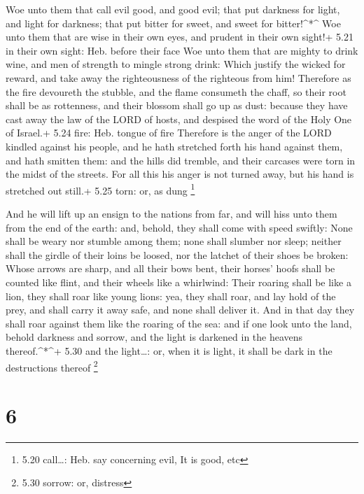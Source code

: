  Woe unto them that call evil good, and good evil; that put
darkness for light, and light for darkness; that put bitter for sweet,
and sweet for bitter!\^{}*\^{}  Woe unto them that are wise
in their own eyes, and prudent in their own sight!+ 5.21 in their own
sight: Heb. before their face  Woe unto them that are
mighty to drink wine, and men of strength to mingle strong drink:
 Which justify the wicked for reward, and take away the
righteousness of the righteous from him!  Therefore as the
fire devoureth the stubble, and the flame consumeth the chaff, so their
root shall be as rottenness, and their blossom shall go up as dust:
because they have cast away the law of the LORD of hosts, and despised
the word of the Holy One of Israel.+ 5.24 fire: Heb. tongue of fire
 Therefore is the anger of the LORD kindled against his
people, and he hath stretched forth his hand against them, and hath
smitten them: and the hills did tremble, and their carcases were torn in
the midst of the streets. For all this his anger is not turned away, but
his hand is stretched out still.+ 5.25 torn: or, as dung \footnote{5.20
  call\ldots: Heb. say concerning evil, It is good, etc}

 And he will lift up an ensign to the nations from far, and
will hiss unto them from the end of the earth: and, behold, they shall
come with speed swiftly:  None shall be weary nor stumble
among them; none shall slumber nor sleep; neither shall the girdle of
their loins be loosed, nor the latchet of their shoes be broken:
 Whose arrows are sharp, and all their bows bent, their
horses' hoofs shall be counted like flint, and their wheels like a
whirlwind:  Their roaring shall be like a lion, they shall
roar like young lions: yea, they shall roar, and lay hold of the prey,
and shall carry it away safe, and none shall deliver it. 
And in that day they shall roar against them like the roaring of the
sea: and if one look unto the land, behold darkness and sorrow, and the
light is darkened in the heavens thereof.\^{}*\^{}+ 5.30 and the
light\ldots: or, when it is light, it shall be dark in the destructions
thereof \footnote{5.30 sorrow: or, distress}

\hypertarget{section-5}{%
\section{6}\label{section-5}}

